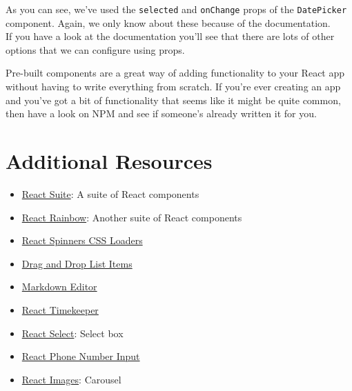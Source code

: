 \inputminted{js}{07-pre-built-components/figures/02-Dates.js}

As you can see, we've used the \texttt{selected} and \texttt{onChange} props of the \texttt{DatePicker} component. Again, we only know about these because of the documentation.
\\

If you have a look at the documentation you'll see that there are lots of other options that we can configure using props.

\hr

Pre-built components are a great way of adding functionality to your React app without having to write everything from scratch. If you're ever creating an app and you've got a bit of functionality that seems like it might be quite common, then have a look on NPM and see if someone's already written it for you.



\section{Additional Resources}

\begin{itemize}[leftmargin=*]
    \item \href{https://rsuitejs.com/en/}{React Suite}: A suite of React components
    \item \href{https://react-rainbow.web.app}{React Rainbow}: Another suite of React components
    \item \href{https://github.com/JoshK2/react-spinners-css}{React Spinners CSS Loaders}
    \item \href{https://github.com/atlassian/react-beautiful-dnd}{Drag and Drop List Items}
    \item \href{https://github.com/uiwjs/react-md-editor}{Markdown Editor}
    \item \href{https://catc.github.io/react-timekeeper/}{React Timekeeper}
    \item \href{https://react-select.com/home}{React Select}: Select box
    \item \href{https://github.com/catamphetamine/react-phone-number-input}{React Phone Number Input}
    \item \href{https://github.com/jossmac/react-images}{React Images}: Carousel
\end{itemize}
